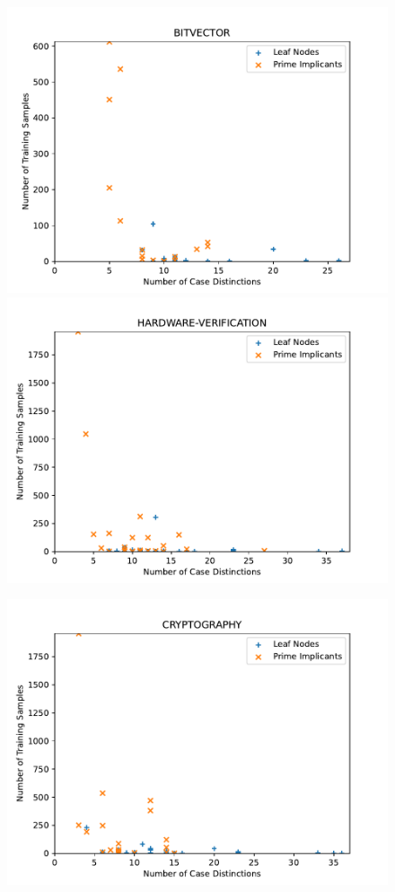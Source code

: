 \documentclass[a4paper, USenglish, cleveref, autoref, thm-restate]{lipics-v2021}
\theoremstyle{definition}
\begin{document}
\begin{figure}
\begin{minipage}{.49\linewidth}
\includegraphics[width=\linewidth]{fig/fam_bitvector_leafs18_imps16.pdf}\\
\includegraphics[width=\linewidth]{fig/fam_hv_leafs24_imps24.pdf}
\end{minipage}
\begin{minipage}{.49\linewidth}
\includegraphics[width=\linewidth]{fig/fam_crypto_leafs24_imps20.pdf}\\

\end{minipage}
\end{figure}
\end{document}
